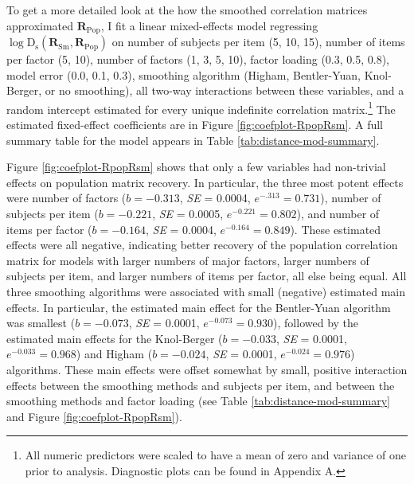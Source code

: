 \documentclass[
  english,
  man]{apa6}
\begin{document}
To get a more detailed look at the how the smoothed correlation matrices approximated \(\mathbf{R}_{\textrm{Pop}}\), I fit a linear mixed-effects model regressing \(\log \mathrm{D}_{\mathrm{s}}(\mathbf{R}_{\textrm{Sm}}, \mathbf{R}_{\textrm{Pop}})\) on number of subjects per item (5, 10, 15), number of items per factor (5, 10), number of factors (1, 3, 5, 10), factor loading (0.3, 0.5, 0.8), model error (0.0, 0.1, 0.3), smoothing algorithm (Higham, Bentler-Yuan, Knol-Berger, or no smoothing), all two-way interactions between these variables, and a random intercept estimated for every unique indefinite correlation matrix.\footnote{All numeric predictors were scaled to have a mean of zero and variance of one prior to analysis. Diagnostic plots can be found in Appendix A.} The estimated fixed-effect coefficients are in Figure \ref{fig:coefplot-RpopRsm}. A full summary table for the model appears in Table \ref{tab:distance-mod-summary}.

Figure \ref{fig:coefplot-RpopRsm} shows that only a few variables had non-trivial effects on population matrix recovery. In particular, the three most potent effects were number of factors (\(b = -0.313\), \emph{SE} = 0.0004, \(e^{-.313} = 0.731\)), number of subjects per item (\(b = -0.221\), \emph{SE} = 0.0005, \(e^{-0.221} = 0.802\)), and number of items per factor (\(b = -0.164\), \emph{SE} = 0.0004, \(e^{-0.164} = 0.849\)). These estimated effects were all negative, indicating better recovery of the population correlation matrix for models with larger numbers of major factors, larger numbers of subjects per item, and larger numbers of items per factor, all else being equal. All three smoothing algorithms were associated with small (negative) estimated main effects. In particular, the estimated main effect for the Bentler-Yuan algorithm was smallest (\(b = -0.073\), \emph{SE} = 0.0001, \(e^{-0.073} = 0.930\)), followed by the estimated main effects for the Knol-Berger (\(b = -0.033\), \emph{SE} = 0.0001, \(e^{-0.033} = 0.968\)) and Higham (\(b = -0.024\), \emph{SE} = 0.0001, \(e^{-0.024} = 0.976\)) algorithms. These main effects were offset somewhat by small, positive interaction effects between the smoothing methods and subjects per item, and between the smoothing methods and factor loading (see Table \ref{tab:distance-mod-summary} and Figure \ref{fig:coefplot-RpopRsm}).
\end{document}
